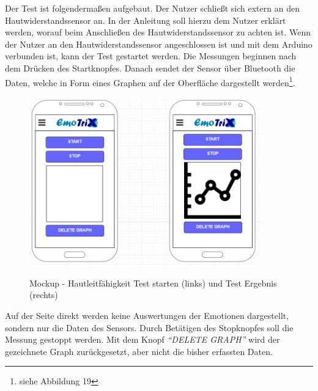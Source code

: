 Der Test ist folgendermaßen aufgebaut. Der Nutzer schließt sich extern an den Hautwiderstandssensor an. In der Anleitung soll hierzu dem Nutzer erklärt werden, worauf beim Anschließen des Hautwiderstandssensor zu achten ist. Wenn der Nutzer an den Hautwiderstandssensor angeschlossen ist und mit dem Arduino verbunden ist, kann der Test gestartet werden. Die Messungen beginnen nach dem Drücken des Startknopfes. Danach sendet der Sensor über Bluetooth die Daten, welche in Form eines Graphen auf der Oberfläche dargestellt werden\footnote{siehe Abbildung 19}. 
\begin{figure}[h]
	\centering
	\includegraphics[width=10cm]{Bilder/Mockup-GSR.png}
	\label{img:Mockup-GSR}
	\caption[Mockup - Hautleitfähigkeit Test starten (links) und Test Ergebnis (rechts)]{Mockup - Hautleitfähigkeit Test starten (links) und Test Ergebnis (rechts)}
\end{figure}\newline
Auf der Seite direkt werden keine Auswertungen der Emotionen dargestellt, sondern nur die Daten des Sensors. Durch Betätigen des Stopknopfes soll die Messung gestoppt werden. Mit dem Knopf \textit{``DELETE GRAPH''} wird der gezeichnete Graph zurückgesetzt, aber nicht die bisher erfassten Daten.
\newline \newline \newline\newline \newline \newline
